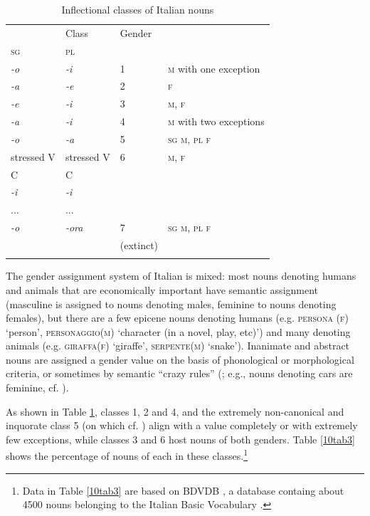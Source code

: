 \documentclass[output=paper,colorlinks,citecolor=brown]{langscibook}
\begin{document}
\begin{table}[ht]
	\centering
	\begin{tabularx}{0.8\textwidth}{llll}
		\lsptoprule
			\multicolumn{2}{l}{Nouns’ endings} & Class & Gender\is{gender} \\
			\textsc{sg} & \textsc{pl} & & \\
			\midrule
			\emph{-o} & \emph{-i} & 1 & \textsc{m} with one exception \\
			\emph{-a} & \emph{-e} & 2 & \textsc{f} \\
			\emph{-e} & \emph{-i} & 3 & \textsc{m, f} \\
			\emph{-a} & \emph{-i} & 4 & \textsc{m} with two exceptions \\
			\emph{-o} & \emph{-a} & 5 & \textsc{sg m, pl f} \\
			\rowcolor{gray!25}
			stressed V & stressed V & 6 & \textsc{m, f} \\
			\rowcolor{gray!25}
			C & C & & \\
			\rowcolor{gray!25}
			 \emph{-i} & \emph{-i} & & \\
			\rowcolor{gray!25}
			... & ... & & \\
			\emph{-o} & \emph{-ora} & 7 & \textsc{sg m, pl f} \\
			& & (extinct) & \\
		\lspbottomrule
	\end{tabularx}
	\caption{Inflectional classes of Italian nouns}
	\label{10tab2}
\end{table}

The gender assignment system of Italian is mixed: most nouns denoting humans and animals that are economically important have semantic assignment (masculine is assigned to nouns denoting males, feminine to nouns denoting females), but there are a few epicene nouns denoting humans (e.g. \textsc{persona} (\textsc{f}) `person', \textsc{personaggio(m)} `character (in a novel, play, etc)') and many denoting animals (e.g. \textsc{giraffa(f)} `giraffe', \textsc{serpente(m)} `snake'). Inanimate and abstract nouns are assigned a gender value on the basis of phonological or morphological criteria, or sometimes by semantic ``crazy rules'' (\citealt{enger2009}; e.g., nouns denoting cars are feminine, cf. \citealt{thornton2001}).

As shown in Table \ref{10tab2}, classes 1, 2 and 4, and the extremely non-canonical and inquorate class 5 (on which cf. \citealt[85--87]{thornton2019-noncanonical}) align with a  value completely or with extremely few exceptions, while classes 3 and 6 host nouns of both genders. Table \ref{10tab3} shows the percentage of nouns of each  in these classes.\footnote{Data in Table \ref{10tab3} are based on BDVDB \citep{thorntoniacobiniburani1997}, a database containg about 4500 nouns belonging to the Italian Basic Vocabulary \citep{demauro1989}.}
\end{document}
